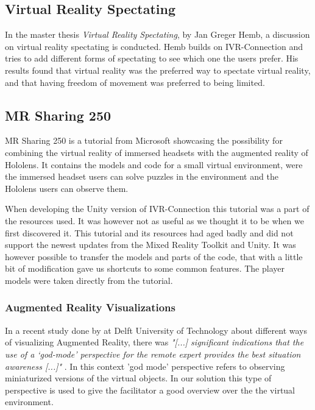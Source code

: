         \subsection{Virtual Reality Spectating}
            In the master thesis \emph{Virtual Reality Spectating}, by Jan Greger Hemb, a discussion on virtual reality spectating is conducted. Hemb builds on IVR-Connection and tries to add different forms of spectating to see which one the users prefer. His results found that virtual reality was the preferred way to spectate virtual reality, and that having freedom of movement was preferred to being limited. \cite{hemb2017}
            
        \subsection{MR Sharing 250}
            MR Sharing 250 is a tutorial from Microsoft showcasing the possibility for combining the virtual reality of immersed headsets with the augmented reality of Hololens. \cite{wdc-mr250} It contains the models and code for a small virtual environment, were the immersed headset users can solve puzzles in the environment and the Hololens users can observe them. 
            
            When developing the Unity version of IVR-Connection this tutorial was a part of the resources used. It was however not as useful as we thought it to be when we first discovered it. This tutorial and its resources had aged badly and did not support the newest updates from the Mixed Reality Toolkit and Unity. It was however possible to transfer the models and parts of the code, that with a little bit of modification gave us shortcuts to some common features. The player models were taken directly from the tutorial.
        
        \subsubsection{Augmented Reality Visualizations}
            In a recent study done by at Delft University of Technology about different ways of visualizing Augmented Reality, there was \emph{"[...] significant indications that the use of a ‘god-mode’ perspective for the remote expert provides the best situation awareness [...]"} \cite{aschenbrenner2018}. In this context 'god mode' perspective refers to observing miniaturized versions of the virtual objects. In our solution this type of perspective is used to give the facilitator a good overview over the the virtual environment.

